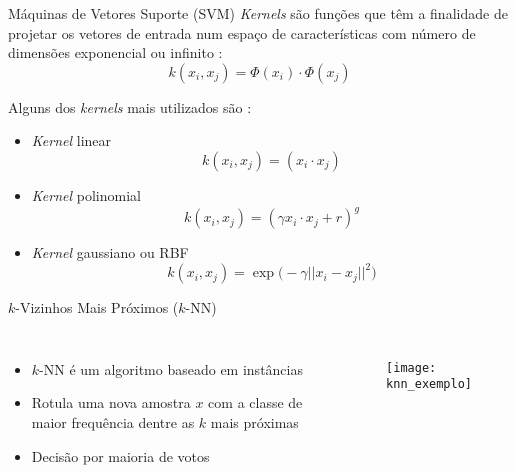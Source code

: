 \begin{frame}{Máquinas de Vetores Suporte (SVM)}
\emph{Kernels} são funções que têm a finalidade de projetar os vetores de entrada num espaço de características com número de dimensões exponencial ou infinito \citep{taylor:04}:
\begin{equation*}
k(x_i, x_j) =  \Phi(x_i) \cdot \Phi(x_j)
\end{equation*}

Alguns dos \emph{kernels} mais utilizados são \citep{lorena:03}:
\begin{itemize}
\item \emph{Kernel} linear
\begin{equation*}
k(x_i, x_j) =  (x_i \cdot x_j)
\end{equation*}

\item \emph{Kernel} polinomial
\begin{equation*}
k(x_i, x_j) =  ({\gamma x_i \cdot x_j + r} )^g
\end{equation*}

\item \emph{Kernel} gaussiano ou RBF
\begin{equation*}
k(x_i, x_j) =  \exp{\big(-\gamma {||x_i - x_j||}^2 \big)}
\end{equation*}
\end{itemize}

\end{frame}

\begin{frame}{$k$-Vizinhos Mais Próximos ($k$-NN)}
\begin{columns}
\begin{itemize}
    \item $k$-NN é um algoritmo baseado em instâncias
    \item Rotula uma nova amostra $x$ com a classe de maior frequência dentre as $k$ mais próximas
    \item Decisão por maioria de votos \citep{duda:12}
\end{itemize}

\begin{figure}[!h]
  \centering
  \texttt{[image: knn\_exemplo]}
\end{figure}
\end{columns}

\end{frame}

